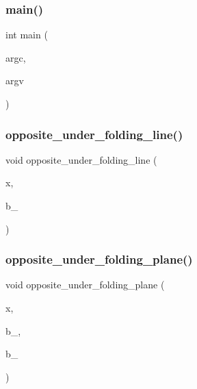 \mbox{\label{hamming_8_c_a3c04138a5bfe5d72780bb7e82a18e627}} 
\subsubsection{\texorpdfstring{main()}{main()}}
{\footnotesize\ttfamily int main (\begin{DoxyParamCaption}\item[{int}]{argc,  }\item[{char $\ast$$\ast$}]{argv }\end{DoxyParamCaption})}

\mbox{\label{hamming_8_c_a12ee45b3d036f6dc56c7adcabbfaaef4}} 
\subsubsection{\texorpdfstring{opposite\+\_\+under\+\_\+folding\+\_\+line()}{opposite\_under\_folding\_line()}}
{\footnotesize\ttfamily void opposite\+\_\+under\+\_\+folding\+\_\+line (\begin{DoxyParamCaption}\item[{\mbox{\hyperlink{galois_8h_a09fddde158a3a20bd2dcadb609de11dc}{I\+NT}} $\ast$}]{x,  }\item[{\mbox{\hyperlink{galois_8h_a09fddde158a3a20bd2dcadb609de11dc}{I\+NT}}}]{b\+\_ }\end{DoxyParamCaption})}

\mbox{\label{hamming_8_c_a6c1af48f0629ffc685bc9c25f506e2ea}} 
\subsubsection{\texorpdfstring{opposite\+\_\+under\+\_\+folding\+\_\+plane()}{opposite\_under\_folding\_plane()}}
{\footnotesize\ttfamily void opposite\+\_\+under\+\_\+folding\+\_\+plane (\begin{DoxyParamCaption}\item[{\mbox{\hyperlink{galois_8h_a09fddde158a3a20bd2dcadb609de11dc}{I\+NT}} $\ast$}]{x,  }\item[{\mbox{\hyperlink{galois_8h_a09fddde158a3a20bd2dcadb609de11dc}{I\+NT}}}]{b\+\_,  }\item[{\mbox{\hyperlink{galois_8h_a09fddde158a3a20bd2dcadb609de11dc}{I\+NT}}}]{b\+\_ }\end{DoxyParamCaption})}

